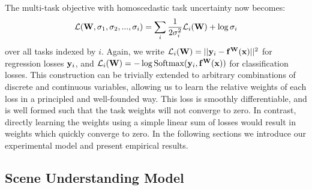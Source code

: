 The multi-task objective with homoscedastic task uncertainty now becomes:
\begin{equation}
\mathcal{L}(\mathbf{W}, \sigma_1, \sigma_2, ..., \sigma_i) = \sum_i \frac{1}{2 \sigma_i^2} \mathcal{L}_i(\mathbf{W}) + \log \sigma_i
\label{eqn:loss_ch2}
\end{equation}
over all tasks indexed by $i$. Again, we write $\mathcal{L}_i(\mathbf{W}) = ||\mathbf{y}_i - \mathbf{f}^{\mathbf{W}}(\mathbf{x})||^2$ for regression losses $\mathbf{y}_i$, and $\mathcal{L}_i(\mathbf{W}) = -\log \text{Softmax} (\mathbf{y}_i, \mathbf{f}^{\mathbf{W}}(\mathbf{x}))$ for classification losses. This construction can be trivially extended to arbitrary combinations of discrete and continuous variables, allowing us to learn the relative weights of each loss in a principled and well-founded way. This loss is smoothly differentiable, and is well formed such that the task weights will not converge to zero. In contrast, directly learning the weights using a simple linear sum of losses  would result in weights which quickly converge to zero. In the following sections we introduce our experimental model and present empirical results.


\subsection{Scene Understanding Model}

